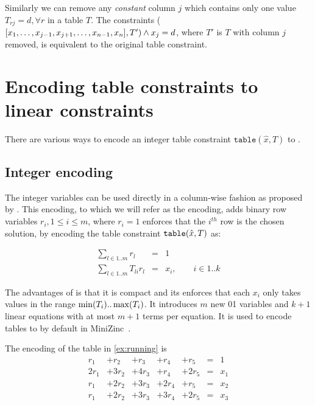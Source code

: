\documentclass[a4paper,UKenglish,cleveref,autoref,thm-restate]{lipics-v2021}
\begin{document}
Similarly we can remove any \textit{constant} column $j$ which contains only one value $T_{rj} = d, \forall r$ in a table $T$.
The constraints 
\ttable($[x_1, \ldots, x_{j-1}, x_{j+1}, \ldots, x_{n-1}, x_n], T') \wedge x_j = d$, where $T'$ is $T$ with column $j$ removed, is equivalent to the original table constraint. 

\section{Encoding table constraints to linear constraints}
\label{sec:encoding}

There are various ways to encode an integer table constraint $\texttt{table}(\hat{x},T)$ to \milp. 

\subsection{Integer encoding}
The integer variables can be used directly in a column-wise fashion as proposed by .
This encoding, to which we will refer as the \baseGleb encoding, adds binary row variables $r_i, 1 \leq i \leq m$, 
where $r_i = 1$ enforces that the $i^{th}$ row is the chosen solution, by encoding the table constraint $\texttt{table}(\hat{x},T)$ as:

\begin{eqnarray}
\sum_{l \in 1..m} r_l  &= &1 \label{simp:enc:1} \\
\sum_{l \in 1..m} T_{li} r_l &=& x_i, \quad\quad i \in 1..k  
\label{simp:enc:2}
\end{eqnarray}

The advantages of \baseGleb is that it is compact and its \relaxation enforces that each $x_i$ only takes values in the range $\min(T_i)..\max(T_i)$. 
It introduces $m$ new 01 variables and $k+1$ linear equations with at most $m+1$ terms per equation.
It is used to encode tables to \milp by default in MiniZinc~\cite{minizinc}.

\begin{example}
    The \baseGleb encoding of the table in \cref{ex:running} is 
    \begin{equation*}
        \begin{array}{rrrrrcl}
        r_1 &+ r_2& + r_3& + r_4& + r_5 &= &1 \\
        2 r_1& + 3r_2& + 4 r_3& + r_4& + 2r_5 &=& x_1 \\
        r_1& + 2r_2& + 3 r_3& + 2r_4&+ r_5 &=& x_2 \\
        r_1& + 2r_2& + 3 r_3& + 3r_4&+ 2r_5 &=& x_3\\
        \end{array}
    \end{equation*}
\end{example}
\end{document}
